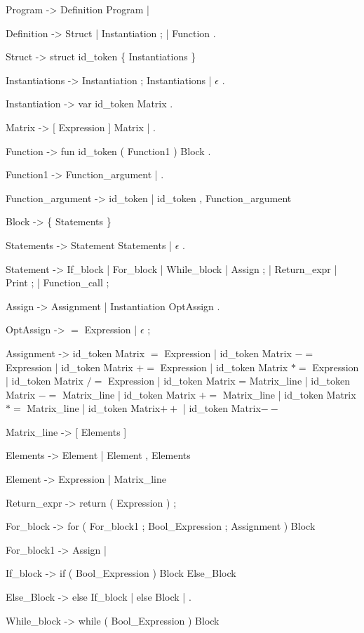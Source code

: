 Program -> Definition Program | \epsilon

Definition -> Struct | Instantiation ; | Function .

Struct -> struct  id_token \{ Instantiations \}

Instantiations -> Instantiation ; Instantiations | $\epsilon$ .

Instantiation -> var id_token Matrix .


Matrix -> [ Expression ] Matrix | .

Function -> fun id_token ( Function1 ) Block .

Function1 -> Function_argument | .

Function_argument -> id_token | id_token , Function_argument

Block -> \{ Statements \}

Statements -> Statement Statements | $\epsilon$ .

Statement -> If_block | For_block | While_block | Assign ; | Return_expr | Print ; | Function_call ; %

Assign -> Assignment | Instantiation OptAssign .

OptAssign -> $=$ Expression | $\epsilon$ ;

Assignment -> id_token Matrix $=$ Expression | id_token Matrix $-=$ Expression | id_token Matrix $+=$ Expression | id_token Matrix $*=$ Expression | id_token Matrix $/=$ Expression | id_token Matrix = Matrix_line | id_token Matrix $-=$ Matrix_line | id_token Matrix $+=$ Matrix_line | id_token Matrix $*=$ Matrix_line  | id_token Matrix$++$ | id_token Matrix$--$

Matrix_line -> [ Elements ]

Elements -> Element | Element , Elements

Element -> Expression | Matrix_line

Return_expr -> return ( Expression ) ;

For_block -> for ( For_block1 ; Bool_Expression ; Assignment ) Block 

For_block1 -> Assign | \epsilon

If_block -> if ( Bool_Expression ) Block Else_Block

Else_Block -> else If_block | else Block |  \epsilon .

While_block -> while ( Bool_Expression ) Block

